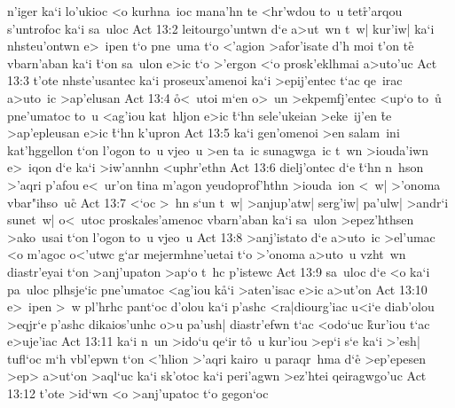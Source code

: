 n'iger
ka`i
lo'ukioc
<o
kurhna~ioc
mana'hn
te
<hr'wdou
to~u
tet\-\r{r}'ar\-qou
s'untrofoc
ka`i
sa~uloc\bibvsend
\vs Act 13:2
leitourgo'untwn
d`e
a>ut~wn
t~w|
kur'iw|
ka`i
nhsteu'ontwn
e>~ipen
t`o
pne~uma
t`o
<'agion
>afor'isate
d'h
moi
t'on
te\r{}
vbarn'aban
ka`i
\r{t}`on
sa~ulon
e>ic
t`o
>'ergon
<`o
prosk'eklhmai
a>uto'uc\bibvsend
\vs Act 13:3
t'ote
nhste'usantec
ka`i
proseux'amenoi
ka`i
>epij'entec
t`ac
qe~irac
a>uto~ic
>ap'elusan\bibvsend
\vs Act 13:4
\r{o}<~utoi
m`en
o>~un
>ekpemfj'entec
<up`o
to~u\r{}
pne'umatoc
to~u
<ag'iou
kat~hljon
e>ic
\r{t}`hn
sele'ukeian
>eke~ij'en
\r{t}e
>ap'epleusan
e>ic
\r{t}`hn
k'upron\bibvsend
\vs Act 13:5
ka`i
gen'omenoi
>en
salam~ini
kat'hggellon
t`on
l'ogon
to~u
vjeo~u
>en
ta~ic
sunagwga~ic
t~wn
>iouda'iwn
e>~iqon
d`e
ka`i
>iw'annhn
<uphr'ethn\bibvsend
\vs Act 13:6
dielj'ontec
d`e
\r{t}`hn
n~hson
>'aqri
p'afou
e<~ur'on
\r{t}ina
m'agon
yeudoprof'hthn
>iouda~ion
<~w|
>'onoma
vbar"ihso~u\r{c}\bibvsend
{}
\vs Act 13:7
<`oc
>~hn
s`un
t~w|
>anjup'atw|
serg'iw|
pa'ulw|
>andr`i
sunet~w|
o<~utoc
proskales'amenoc
vbarn'aban
ka`i
sa~ulon
>epez'hthsen
>ako~usai
t`on
l'ogon
to~u
vjeo~u\bibvsend
\vs Act 13:8
>anj'istato
d`e
a>uto~ic
>el'umac
<o
m'agoc
o<'utwc
g`ar
mejermhne'uetai
t`o
>'onoma
a>uto~u
vzht~wn
diastr'eyai
t`on
>anj'upaton
>ap`o
t~hc
p'istewc\bibvsend
\vs Act 13:9
sa~uloc
d`e
<o
ka`i
pa~uloc
plhsje`ic
pne'umatoc
<ag'iou
k\r{a}`i
>aten'isac
e>ic
a>ut'on\bibvsend
\vs Act 13:10
e>~ipen
>~w
pl'hrhc
pant`oc
d'olou
ka`i
p'ashc
<ra|diourg'iac
u<i`e
diab'olou
>eqjr`e
p'ashc
dikaios'unhc
o>u
pa'ush|
diastr'efwn
t`ac
<odo`uc
\r{k}ur'iou
t`ac
e>uje'iac\bibvsend
\vs Act 13:11
ka`i
n~un
>ido`u
qe`ir
t\r{o}~u
kur'iou
>ep`i
s`e
ka`i
>'esh|
tufl`oc
m`h
vbl'epwn
t`on
<'hlion
>'aqri
kairo~u
paraqr~hma
d`e\r{}
>ep'epesen
>ep>
a>ut`on
>aql`uc
ka`i
sk'otoc
ka`i
peri'agwn
>ez'htei
qeiragwgo'uc\bibvsend
\vs Act 13:12
t'ote
>id`wn
<o
>anj'upatoc
t`o
gegon`oc

